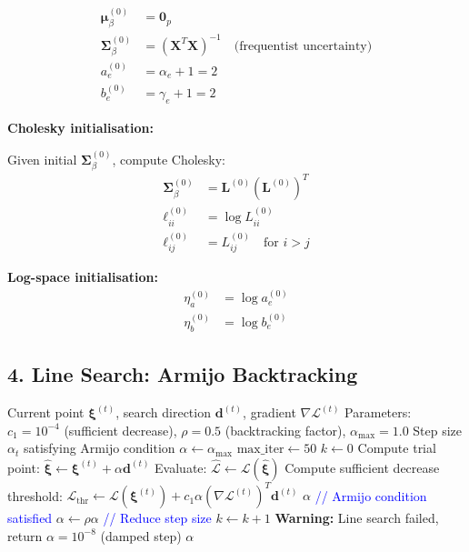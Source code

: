 \documentclass[11pt,a4paper]{article}
\begin{document}
\begin{align}
\bm{\mu}_\beta^{(0)} &= \bm{0}_p\\
\bm{\Sigma}_\beta^{(0)} &= (\bm{X}^T \bm{X})^{-1} \quad \text{(frequentist uncertainty)}\\
a_e^{(0)} &= \alpha_e + 1 = 2\\
b_e^{(0)} &= \gamma_e + 1 = 2
\end{align}

\textbf{Cholesky initialisation:}

Given initial $\bm{\Sigma}_\beta^{(0)}$, compute Cholesky:
\begin{align}
\bm{\Sigma}_\beta^{(0)} &= \bm{L}^{(0)} (\bm{L}^{(0)})^T\\
\ell_{ii}^{(0)} &= \log L_{ii}^{(0)}\\
\ell_{ij}^{(0)} &= L_{ij}^{(0)} \quad \text{for } i > j
\end{align}

\textbf{Log-space initialisation:}
\begin{align}
\eta_a^{(0)} &= \log a_e^{(0)}\\
\eta_b^{(0)} &= \log b_e^{(0)}
\end{align}

\subsection*{4. Line Search: Armijo Backtracking}

\begin{algorithm}[H]
\caption{Armijo Backtracking Line Search}
\begin{algorithmic}[1]
\REQUIRE Current point $\bm{\xi}^{(t)}$, search direction $\bm{d}^{(t)}$, gradient $\nabla \mathcal{L}^{(t)}$
\REQUIRE Parameters: $c_1 = 10^{-4}$ (sufficient decrease), $\rho = 0.5$ (backtracking factor), $\alpha_{\max} = 1.0$
\ENSURE Step size $\alpha_t$ satisfying Armijo condition
\STATE $\alpha \leftarrow \alpha_{\max}$
\STATE $\text{max\_iter} \leftarrow 50$
\STATE $k \leftarrow 0$
    \STATE Compute trial point: $\hat{\bm{\xi}} \leftarrow \bm{\xi}^{(t)} + \alpha \bm{d}^{(t)}$
    \STATE Evaluate: $\hat{\mathcal{L}} \leftarrow \mathcal{L}(\hat{\bm{\xi}})$
    \STATE Compute sufficient decrease threshold: $\mathcal{L}_{\text{thr}} \leftarrow \mathcal{L}(\bm{\xi}^{(t)}) + c_1 \alpha (\nabla \mathcal{L}^{(t)})^T \bm{d}^{(t)}$
        \RETURN $\alpha$ \quad \textcolor{blue}{// Armijo condition satisfied}
    \ENDIF
    \STATE $\alpha \leftarrow \rho \alpha$ \quad \textcolor{blue}{// Reduce step size}
    \STATE $k \leftarrow k + 1$
\ENDWHILE
\STATE \textbf{Warning:} Line search failed, return $\alpha = 10^{-8}$ (damped step)
\RETURN $\alpha$
\end{algorithmic}
\end{algorithm}
\end{document}
